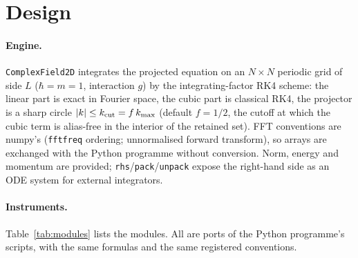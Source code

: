 \documentclass[11pt,a4paper]{article}
\begin{document}
\section{Design}\label{sec:design}

\paragraph{Engine.} \texttt{ComplexField2D} integrates the projected equation on an $N\times N$ periodic grid of side $L$ ($\hbar=m=1$, interaction $g$) by the integrating-factor RK4 scheme: the linear
part is exact in Fourier space, the cubic part is classical RK4, the projector is a sharp circle $|k|\le k_{\rm cut}=f\,k_{\max}$ (default $f=1/2$, the cutoff at which the cubic term is alias-free in the interior of the retained set).
FFT conventions are numpy's (\texttt{fftfreq} ordering; unnormalised forward transform), so arrays are exchanged with the Python programme without conversion. Norm, energy and momentum are provided;
\texttt{rhs}/\texttt{pack}/\texttt{unpack} expose the right-hand side as an ODE system for external integrators.

\paragraph{Instruments.} Table~\ref{tab:modules} lists the modules. All are ports of the Python programme's scripts, with the same formulas and the same registered conventions.
\end{document}

